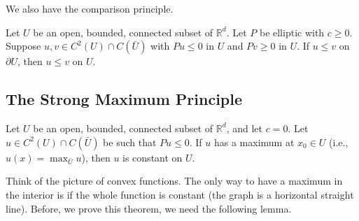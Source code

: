 We also have the comparison principle. 

\begin{theorem}
\label{thm: Comparison principle}
 Let $U$ be an open, bounded, connected subset of $\mathbb{R}^{d}$. Let $P$ be elliptic with $c \geq 0$. Suppose $u, v \in C^{2}(U) \cap C(\bar{U})$ with $P u \leq 0$ in $U$ and $P v \geq 0$ in $U$. If $u \leq v$ on $\partial U$, then $u \leq v$ on $U$.
\end{theorem}

\subsection{The Strong Maximum Principle}

\begin{theorem}
\label{thm: Strong maximum principle}
 Let $U$ be an open, bounded, connected subset of $\mathbb{R}^{d}$, and let $c=0$. Let $u \in C^{2}(U) \cap C(\bar{U})$ be such that $P u \leq 0$. If $u$ has a maximum at $x_{0} \in U$ (i.e.,$u(x)=\max _{\bar{U}} u$), then $u$ is constant on $U$.
\end{theorem}
Think of the picture of convex functions. The only way to have a maximum in the interior is if the whole function is constant (the graph is a horizontal straight line). Before, we prove this theorem, we need the following lemma.


